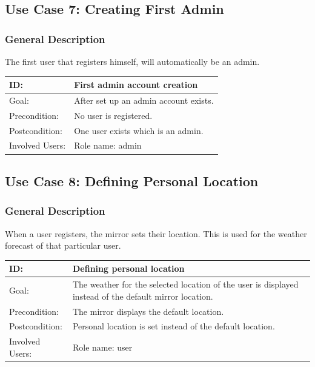 \documentclass[12pt]{article}
\theoremstyle{definition}
\begin{document}
\subsection{Use Case 7: Creating First Admin}
\subsubsection{General Description}
The first user that registers himself, will automatically be an admin.\\

\begin{tabular}{|p{.2\linewidth}|p{.65\linewidth}|}
\hline 
ID: & First admin account creation\\ \hline
Goal: & After set up an admin account exists.\\ \hline
Precondition: & No user is registered.\\ \hline
Postcondition: &  One user exists which is an admin. \\ \hline
Involved Users: & Role name: admin \\ \hline
\end{tabular}

\subsection{Use Case 8: Defining Personal Location}
\subsubsection{General Description}
When a user registers, the mirror sets their location. This is used for the weather forecast of that particular user.\\

\begin{tabular}{|p{.2\linewidth}|p{.65\linewidth}|}
\hline 
ID: & Defining personal location\\ \hline
Goal: & The weather for the selected location of the user is displayed instead of the default mirror location.\\ \hline
Precondition: & The mirror displays the default location.\\ \hline
Postcondition: &  Personal location is set instead of the default location. \\ \hline
Involved Users: & Role name: user \\ \hline
\end{tabular}
\end{document}

